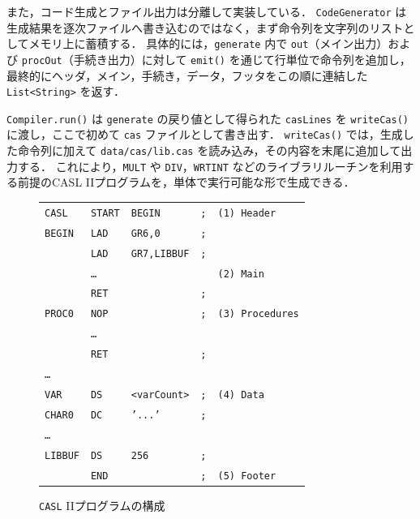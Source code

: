 \documentclass[a4j,10pt]{jarticle}
\begin{document}
また，コード生成とファイル出力は分離して実装している．
\verb|CodeGenerator| は生成結果を逐次ファイルへ書き込むのではなく，まず命令列を文字列のリストとしてメモリ上に蓄積する．
具体的には，\verb|generate| 内で \verb|out|（メイン出力）および \verb|procOut|（手続き出力）に対して \verb|emit()| を通じて行単位で命令列を追加し，最終的にヘッダ，メイン，手続き，データ，フッタをこの順に連結した \verb|List<String>| を返す．

\verb|Compiler.run()| は \verb|generate| の戻り値として得られた \verb|casLines| を \verb|writeCas()| に渡し，ここで初めて \verb|cas| ファイルとして書き出す．
\verb|writeCas()| では，生成した命令列に加えて \verb|data/cas/lib.cas| を読み込み，その内容を末尾に追加して出力する．
これにより，\verb|MULT| や \verb|DIV|，\verb|WRTINT| などのライブラリルーチンを利用する前提のCASL IIプログラムを，単体で実行可能な形で生成できる．

\begin{figure}[htb]
\centering
\small
\setlength{\tabcolsep}{5pt}
\begin{tabular}{@{}l l l l l@{}}
\hline
\texttt{CASL}  & \texttt{START} & \texttt{BEGIN} & \texttt{;} & \texttt{(1) Header} \\
\texttt{BEGIN} & \texttt{LAD}   & \texttt{GR6,0} & \texttt{;} & \\
               & \texttt{LAD}   & \texttt{GR7,LIBBUF} & \texttt{;} & \\
               & \multicolumn{3}{l}{\texttt{\dots}} & \texttt{(2) Main} \\
               & \texttt{RET}   &                & \texttt{;} & \\
\texttt{PROC0} & \texttt{NOP}   &                & \texttt{;} & \texttt{(3) Procedures} \\
               & \multicolumn{3}{l}{\texttt{\dots}} & \\
               & \texttt{RET}   &                & \texttt{;} & \\
\multicolumn{3}{l}{\texttt{\dots}} & & \\
\texttt{VAR}   & \texttt{DS}    & \texttt{<varCount>} & \texttt{;} & \texttt{(4) Data} \\
\texttt{CHAR0} & \texttt{DC}    & \texttt{'...'} & \texttt{;} & \\
\multicolumn{3}{l}{\texttt{\dots}} & & \\
\texttt{LIBBUF}& \texttt{DS}    & \texttt{256}   & \texttt{;} & \\
               & \texttt{END}   &                & \texttt{;} & \texttt{(5) Footer} \\
\hline
\end{tabular}
\caption{\texttt{CASL} IIプログラムの構成}
\label{fig:casl-skel}
\end{figure}
\end{document}
